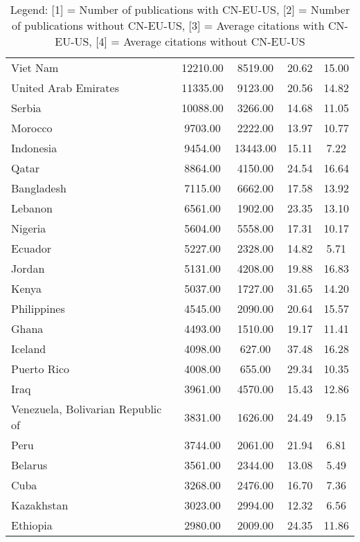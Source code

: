 \begin{table}[ht]
\begin{tabular}{lcccc}
Viet Nam & 12210.00 & 8519.00 & 20.62 & 15.00\\
United Arab Emirates & 11335.00 & 9123.00 & 20.56 & 14.82\\
Serbia & 10088.00 & 3266.00 & 14.68 & 11.05\\
Morocco & 9703.00 & 2222.00 & 13.97 & 10.77\\
Indonesia & 9454.00 & 13443.00 & 15.11 & 7.22\\
Qatar & 8864.00 & 4150.00 & 24.54 & 16.64\\
Bangladesh & 7115.00 & 6662.00 & 17.58 & 13.92\\
Lebanon & 6561.00 & 1902.00 & 23.35 & 13.10\\
Nigeria & 5604.00 & 5558.00 & 17.31 & 10.17\\
Ecuador & 5227.00 & 2328.00 & 14.82 & 5.71\\
Jordan & 5131.00 & 4208.00 & 19.88 & 16.83\\
Kenya & 5037.00 & 1727.00 & 31.65 & 14.20\\
Philippines & 4545.00 & 2090.00 & 20.64 & 15.57\\
Ghana & 4493.00 & 1510.00 & 19.17 & 11.41\\
Iceland & 4098.00 & 627.00 & 37.48 & 16.28\\
Puerto Rico & 4008.00 & 655.00 & 29.34 & 10.35\\
Iraq & 3961.00 & 4570.00 & 15.43 & 12.86\\
Venezuela, Bolivarian Republic of & 3831.00 & 1626.00 & 24.49 & 9.15\\
Peru & 3744.00 & 2061.00 & 21.94 & 6.81\\
Belarus & 3561.00 & 2344.00 & 13.08 & 5.49\\
Cuba & 3268.00 & 2476.00 & 16.70 & 7.36\\
Kazakhstan & 3023.00 & 2994.00 & 12.32 & 6.56\\
Ethiopia & 2980.00 & 2009.00 & 24.35 & 11.86\\
\hline
\end{tabular}
\caption{Legend: [1] = Number of publications with CN-EU-US, [2] = Number of publications without CN-EU-US, [3] = Average citations with CN-EU-US, [4] = Average citations without CN-EU-US}
\end{table}
